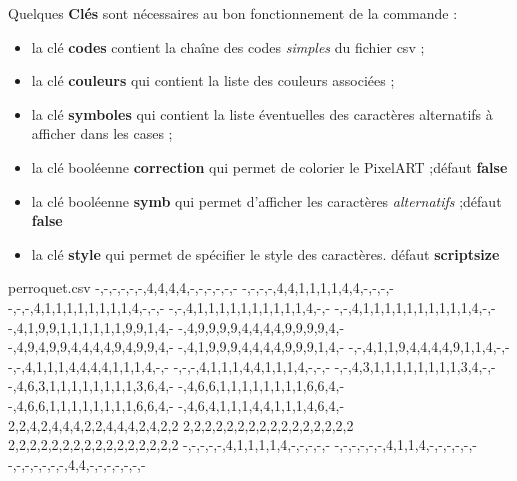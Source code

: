\documentclass{article}
\newcommand\Cle[1]{{\bfseries\sffamily\textlangle #1\textrangle}}
\begin{document}
\begin{codecles}
Quelques \Cle{Clés} sont nécessaires au bon fonctionnement de la commande :

\begin{itemize}
	\item la clé \Cle{codes} contient la \textsf{chaîne} des codes \textit{simples} du  fichier \textsf{csv} ;
	\item la clé \Cle{couleurs} qui contient la \textsf{liste} des couleurs associées ;
	\item la clé \Cle{symboles} qui contient la \textsf{liste éventuelles} des caractères alternatifs à afficher dans les cases ;
	\item la clé booléenne \Cle{correction} qui permet de colorier le PixelART ;\hfill{}défaut \Cle{false}
	\item la clé booléenne \Cle{symb} qui permet d'afficher les caractères \textit{alternatifs} ;\hfill{}défaut \Cle{false}
	\item la clé \Cle{style} qui permet de spécifier le style des caractères. \hfill{}défaut \Cle{scriptsize}
\end{itemize}
\end{codecles}

\begin{codetex}

\begin{filecontents*}[overwrite]{perroquet.csv}
-,-,-,-,-,-,4,4,4,4,-,-,-,-,-,-
-,-,-,-,4,4,1,1,1,1,4,4,-,-,-,-
-,-,-,4,1,1,1,1,1,1,1,1,4,-,-,-
-,-,4,1,1,1,1,1,1,1,1,1,1,4,-,-
-,-,4,1,1,1,1,1,1,1,1,1,1,4,-,-
-,4,1,9,9,1,1,1,1,1,1,9,9,1,4,-
-,4,9,9,9,9,4,4,4,4,9,9,9,9,4,-
-,4,9,4,9,9,4,4,4,4,9,4,9,9,4,-
-,4,1,9,9,9,4,4,4,4,9,9,9,1,4,-
-,-,4,1,1,9,4,4,4,4,9,1,1,4,-,-
-,-,4,1,1,1,4,4,4,4,1,1,1,4,-,-
-,-,-,4,1,1,1,4,4,1,1,1,4,-,-,-
-,-,4,3,1,1,1,1,1,1,1,1,3,4,-,-
-,4,6,3,1,1,1,1,1,1,1,1,3,6,4,-
-,4,6,6,1,1,1,1,1,1,1,1,6,6,4,-
-,4,6,6,1,1,1,1,1,1,1,1,6,6,4,-
-,4,6,4,1,1,1,4,4,1,1,1,4,6,4,-
2,2,4,2,4,4,4,2,2,4,4,4,2,4,2,2
2,2,2,2,2,2,2,2,2,2,2,2,2,2,2,2
2,2,2,2,2,2,2,2,2,2,2,2,2,2,2,2
-,-,-,-,-,4,1,1,1,1,4,-,-,-,-,-
-,-,-,-,-,-,4,1,1,4,-,-,-,-,-,-
-,-,-,-,-,-,-,4,4,-,-,-,-,-,-,-
\end{filecontents*}


\end{codetex}
\end{document}

